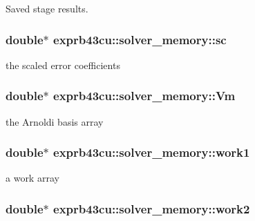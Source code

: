 Saved stage results. 

\subsubsection[{\texorpdfstring{sc}{sc}}]{\setlength{\rightskip}{0pt plus 5cm}double$\ast$ exprb43cu\+::solver\+\_\+memory\+::sc}\hypertarget{structexprb43cu_1_1solver__memory_aff9b454c8a0c5ecef261b359c44db926}{}\label{structexprb43cu_1_1solver__memory_aff9b454c8a0c5ecef261b359c44db926}


the scaled error coefficients 

\subsubsection[{\texorpdfstring{Vm}{Vm}}]{\setlength{\rightskip}{0pt plus 5cm}double$\ast$ exprb43cu\+::solver\+\_\+memory\+::\+Vm}\hypertarget{structexprb43cu_1_1solver__memory_a3b68c5a632fe265037cd25195e266c65}{}\label{structexprb43cu_1_1solver__memory_a3b68c5a632fe265037cd25195e266c65}


the Arnoldi basis array 

\subsubsection[{\texorpdfstring{work1}{work1}}]{\setlength{\rightskip}{0pt plus 5cm}double$\ast$ exprb43cu\+::solver\+\_\+memory\+::work1}\hypertarget{structexprb43cu_1_1solver__memory_a97191dca9ff8d04d16d37b26fbea4906}{}\label{structexprb43cu_1_1solver__memory_a97191dca9ff8d04d16d37b26fbea4906}


a work array 

\subsubsection[{\texorpdfstring{work2}{work2}}]{\setlength{\rightskip}{0pt plus 5cm}double$\ast$ exprb43cu\+::solver\+\_\+memory\+::work2}\hypertarget{structexprb43cu_1_1solver__memory_a9339316b1097345efa3b55832b3d0d1c}{}\label{structexprb43cu_1_1solver__memory_a9339316b1097345efa3b55832b3d0d1c}


